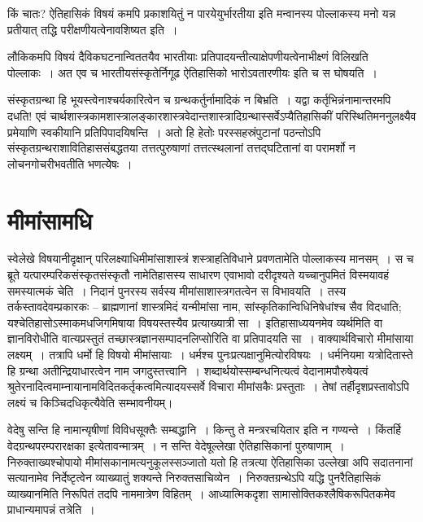 किं चातः? ऐतिहासिकं विषयं कमपि प्रकाशयितुं न पारयेयुर्भारतीया इति मन्वानस्य पोल्लाकस्य
 मनो यन्न प्रतीयात् तद्धि परीक्षणीयत्वेनावशिष्यत इति~।

लौकिकमपि विषयं दैविकघटनान्विततयैव भारतीयाः प्रतिपादयन्तीत्याक्षेपणीयत्वेनाभीक्ष्णं विलिखति पोल्लाकः~। अत एव च भारतीयसंस्कृतेर्निगूढ ऐतिहासिको भारोऽवतारणीयः इति च स घोषयति~।

संस्कृतग्रन्था हि भूयस्त्वेनाश्चर्यकारित्वेन च ग्रन्थकर्तुर्नामादिकं न बिभ्रति~। यद्वा कर्तृभिन्नं\break नामान्तरमपि दधति! एवं चार्थशास्त्रकामशास्त्रालङ्कारशास्त्रवेदान्तशास्त्रादिग्रन्थास्सर्वेऽप्यैतिहासिकीं परिस्थितिमननुलक्ष्यैव प्रमेयाणि स्वकीयानि प्रतिपिपादयिषन्ति~। अतो हि हेतोः परस्सहस्रं\break पुटानां पठन्तोऽपि संस्कृतग्रन्थराशावितिहाससंबद्धतया तत्तत्पुरुषाणां तत्तत्स्थलानां तत्तद्घटितानां वा परामर्शो न लोचनगोचरीभवतीति भणत्येेषः~।


\section*{मीमांसामधि}

स्वेलेखे विषयानीदृक्षान् परिलक्ष्याधिमीमांसाशास्त्रं शस्त्राहतिविधाने प्रवणतामेति पोल्लाकस्य मानसम्~। स च ब्रूते यत्पारम्परिकसंस्कृतसंस्कृतौ नामेतिहासस्य साधारण एवाभावो दरीदृश्यते यच्चानुपमितं विस्मयावहं समस्यात्मकं चेति~। निदानं पुनरस्य सर्वस्य मीमांसाशास्त्रगतत्वेन स विभावयति~। तस्य तर्कस्तावदेवम्प्रकारकः – ब्राह्मणानां शास्त्रमिदं यन्मीमांसा नाम, सांस्कृतिकान्विधिनिषेधांश्च सैव विदधाति; यश्चेतिहासोऽस्माकमधजिगमिषाया विषयस्तस्यैव प्रत्याख्यात्री सा~। इतिहासाध्ययनमेव व्यर्थमिति वा ज्ञानविरोधीति वात्यप्रस्तुतं तच्छास्त्रज्ञानसम्पादनलिप्सोरिति वा प्रतिपादयति सा~। वाक्यार्थविचारो मीमांसाया लक्ष्यम्~। तत्रापि धर्मो हि विषयो मीमांसायाः~। धर्मश्च पुनःप्रत्यक्षानुमित्योरविषयः~। धर्मनियमा यत्रोदितास्ते हि ग्रन्था अतीन्द्रियाधारत्वेन नाम जगदुस्तत्त्वानि~। शब्दार्थयोस्सम्बन्धनित्यत्वं वेदानामपौरुषेयत्वं श्रुतेरनादित्वमाम्नायानामविदितकर्तृकत्वमित्यादयस्सर्वे विचारा मीमांसकैः प्रस्तुताः~। तेषां तर्हीदृशप्रस्तावोऽपि लक्ष्यं च किञ्चिदधिकृत्यैवेति सम्भावनीयम्।

वेदेषु सन्ति हि नामान्यृषीणां विविधसूक्तैः सम्बद्धानि~। किन्तु ते मन्त्ररचयितार इति न गण्यन्ते~। किंतर्हि वेदग्रन्थपरम्परारक्षका इत्येतावन्मात्रम्~। न सन्ति वेदेषूल्लेखा ऐतिहासिकानां पुरुषाणाम्~। निरुक्ताख्यश्चोपायो मीमांसकानामत्यनुकूलस्सञ्जातो यतो हि तत्रत्या ऐतिहासिका उल्लेखा अपि सदातनानां सत्यानामेव निर्देष्टृत्वेन व्याख्यातुं शक्यन्ते निरुक्तसाचिव्येन~।
 निरुक्तग्रन्थेऽपि यद्धि पुनरैतिहासिकं व्याख्यानमिति निरूपितं तदपि नाममात्रेण विहितम्~। आध्यात्मिकदृशा सामासोक्तिकश्लैषिकरूपितकमेव प्राधान्यमापन्नं तत्रेति~।

